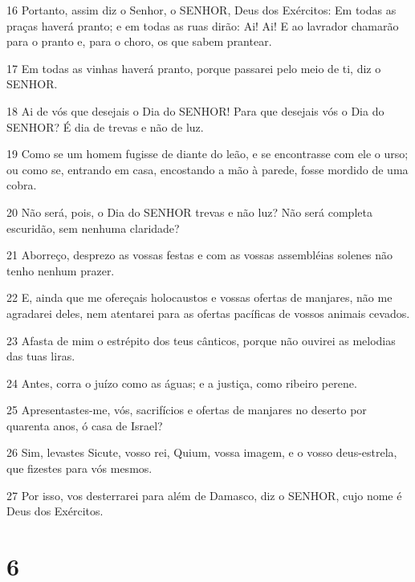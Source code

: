 \par 16 Portanto, assim diz o Senhor, o SENHOR, Deus dos Exércitos: Em todas as praças haverá pranto; e em todas as ruas dirão: Ai! Ai! E ao lavrador chamarão para o pranto e, para o choro, os que sabem prantear.
\par 17 Em todas as vinhas haverá pranto, porque passarei pelo meio de ti, diz o SENHOR.
\par 18 Ai de vós que desejais o Dia do SENHOR! Para que desejais vós o Dia do SENHOR? É dia de trevas e não de luz.
\par 19 Como se um homem fugisse de diante do leão, e se encontrasse com ele o urso; ou como se, entrando em casa, encostando a mão à parede, fosse mordido de uma cobra.
\par 20 Não será, pois, o Dia do SENHOR trevas e não luz? Não será completa escuridão, sem nenhuma claridade?
\par 21 Aborreço, desprezo as vossas festas e com as vossas assembléias solenes não tenho nenhum prazer.
\par 22 E, ainda que me ofereçais holocaustos e vossas ofertas de manjares, não me agradarei deles, nem atentarei para as ofertas pacíficas de vossos animais cevados.
\par 23 Afasta de mim o estrépito dos teus cânticos, porque não ouvirei as melodias das tuas liras.
\par 24 Antes, corra o juízo como as águas; e a justiça, como ribeiro perene.
\par 25 Apresentastes-me, vós, sacrifícios e ofertas de manjares no deserto por quarenta anos, ó casa de Israel?
\par 26 Sim, levastes Sicute, vosso rei, Quium, vossa imagem, e o vosso deus-estrela, que fizestes para vós mesmos.
\par 27 Por isso, vos desterrarei para além de Damasco, diz o SENHOR, cujo nome é Deus dos Exércitos.

\chapter{6}

